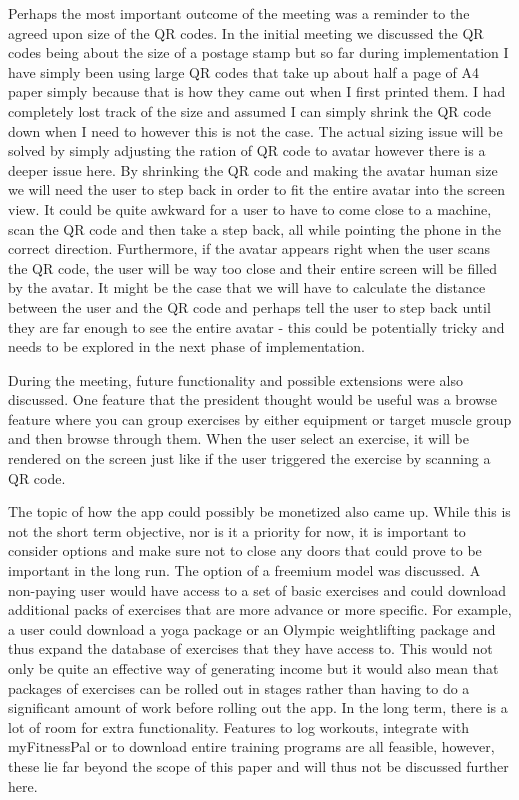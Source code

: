\documentclass{l4proj}
\begin{document}
Perhaps the most important outcome of the meeting was a reminder to the agreed upon size of the QR codes. In the initial meeting we discussed the QR codes being about the size of a postage stamp but so far during implementation I have simply been using large QR codes that take up about half a page of A4 paper simply because that is how they came out when I first printed them. I had completely lost track of the size and assumed I can simply shrink the QR code down when I need to however this is not the case. The actual sizing issue will be solved by simply adjusting the ration of QR code to avatar however there is a deeper issue here. By shrinking the QR code and making the avatar human size we will need the user to step back in order to fit the entire avatar into the screen view. It could be quite awkward for a user to have to come close to a machine, scan the QR code and then take a step back, all while pointing the phone in the correct direction. Furthermore, if the avatar appears right when the user scans the QR code, the user will be way too close and their entire screen will be filled by the avatar. It might be the case that we will have to calculate the distance between the user and the QR code and perhaps tell the user to step back until they are far enough to see the entire avatar - this could be potentially tricky and needs to be explored in the next phase of implementation. 

During the meeting, future functionality and possible extensions were also discussed. One feature that the president thought would be useful was a browse feature where you can group exercises by either equipment or target muscle group and then browse through them. When the user select an exercise, it will be rendered on the screen just like if the user triggered the exercise by scanning a QR code.

The topic of how the app could possibly be monetized also came up. While this is not the short term objective, nor is it a priority for now, it is important to consider options and make sure not to close any doors that could prove to be important in the long run. The option of a freemium model was discussed. A non-paying user would have access to a set of basic exercises and could download additional packs of exercises that are more advance or more specific. For example, a user could download a yoga package or an Olympic weightlifting package and thus expand the database of exercises that they have access to. This would not only be quite an effective way of generating income but it would also mean that packages of exercises can be rolled out in stages rather than having to do a significant amount of work before rolling out the app. In the long term, there is a lot of room for extra functionality. Features to log workouts, integrate with myFitnessPal or to download entire training programs are all feasible, however, these lie far beyond the scope of this paper and will thus not be discussed further here.
\end{document}
